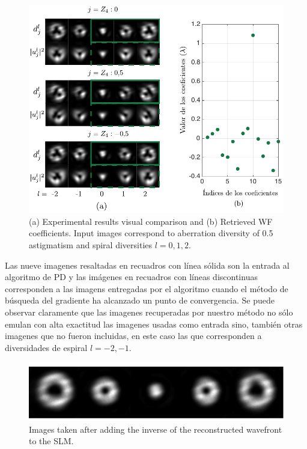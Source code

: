 \begin{figure}[h!]
\centering
\includegraphics[scale=1]{experimental_results_07032015_small.pdf}
\caption[Resultados experimentales de la reconstrucción de fase con
PD.]{(a) Experimental results visual comparison and (b) Retrieved  WF
  coefficients. Input images correspond to aberration diversity of 
  0.5 astigmatism and spiral diversities $l=0,1,2$.} 
\label{fig:exp_results}
\end{figure} 

Las nueve imagenes resaltadas en recuadros con línea sólida son la
entrada al algoritmo de PD y las imágenes en recuadros con líneas
discontinuas corresponden a las imagens entregadas por el algoritmo
cuando el método de búsqueda del gradiente ha alcanzado un punto de
convergencia. Se puede observar claramente que las imagenes
recuperadas por nuestro método no sólo emulan con alta exactitud las
imagenes usadas como entrada sino, también otras imagenes que no
fueron incluidas, en este caso las que corresponden a diversidades de
espiral $l=-2,-1$.

\begin{figure}[h!]
\centering
\includegraphics[scale=.7]{PSF_comparison_experimental_results_07032015.pdf}
\caption[VO registrados luego de restar las aberraciones detectadas
  con PD.]{Images taken after adding the inverse of the reconstructed  
  wavefront to the SLM.}  
\label{fig:exp_correction}
\end{figure}

\newpage
\pagebreak[4]

